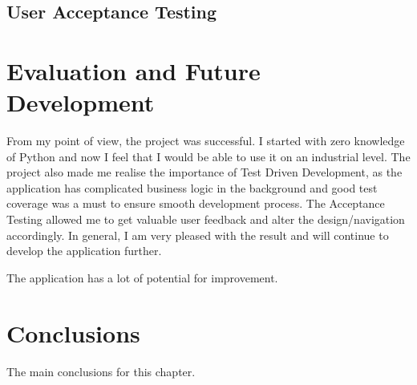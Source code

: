 \subsection{User Acceptance Testing}

\section{Evaluation and Future Development}
From my point of view, the project was successful. I started with zero knowledge of Python and now I feel that I would be able to use it on an industrial level. The project also made me realise the importance of Test Driven Development, as the application has complicated business logic in the background and good test coverage was a must to ensure smooth development process. The Acceptance Testing allowed me to get valuable user feedback and alter the design/navigation accordingly. In general, I am very pleased with the result and will continue to develop the application further.

The application has a lot of potential for improvement.

\section{Conclusions}

The main conclusions for this chapter.


